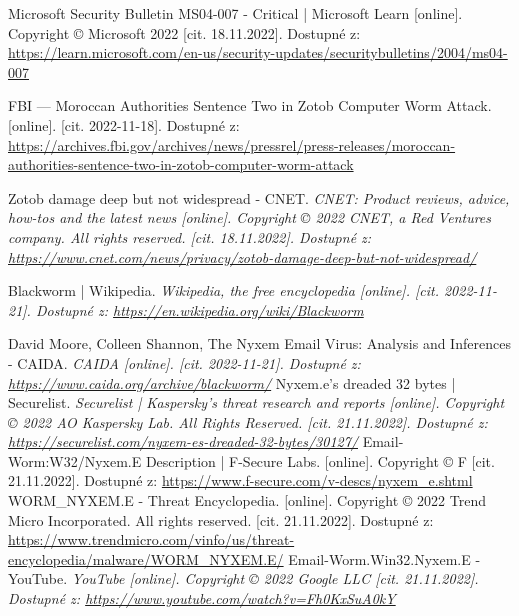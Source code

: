 \documentclass[a4paper,12pt]{article}
\begin{document}
{	
	{
		Microsoft Security Bulletin MS04-007 - Critical | Microsoft Learn
		[online]. Copyright © Microsoft 2022 [cit. 18.11.2022]. 
		Dostupné z: \url{https://learn.microsoft.com/en-us/security-updates/securitybulletins/2004/ms04-007}
	}
	
	{
		FBI — Moroccan Authorities Sentence Two in Zotob Computer Worm Attack. 
		[online]. [cit. 2022-11-18].
		Dostupné z: \url{https://archives.fbi.gov/archives/news/pressrel/press-releases/moroccan-authorities-sentence-two-in-zotob-computer-worm-attack}
	}
	
	{
		Zotob damage deep but not widespread - CNET. 
		\it{CNET: Product reviews, advice, how-tos and the latest news}
		[online]. Copyright © 2022 CNET, a Red Ventures company. All rights reserved. [cit. 18.11.2022].
		Dostupné z: \url{https://www.cnet.com/news/privacy/zotob-damage-deep-but-not-widespread/}
	}
	
	{
		Blackworm | Wikipedia.
		\it{Wikipedia, the free encyclopedia} [online]. [cit. 2022-11-21].
		Dostupné z: \url{https://en.wikipedia.org/wiki/Blackworm}
	}
	
	{
		David Moore, Colleen Shannon,
		The Nyxem Email Virus: Analysis and Inferences - CAIDA.
		\it{CAIDA} [online]. [cit. 2022-11-21].
		Dostupné z: \url{https://www.caida.org/archive/blackworm/}
	}
	{
		Nyxem.e’s dreaded 32 bytes | Securelist.
		\it{Securelist | Kaspersky’s threat research and reports} [online].
		Copyright © 2022 AO Kaspersky Lab. All Rights Reserved. [cit. 21.11.2022].
		Dostupné z: \url{https://securelist.com/nyxem-es-dreaded-32-bytes/30127/}
	}
	{
		Email-Worm:W32/Nyxem.E Description | F-Secure Labs.
		[online]. Copyright © F [cit. 21.11.2022].
		Dostupné z: \url{https://www.f-secure.com/v-descs/nyxem_e.shtml}
	}
	{
		WORM\_NYXEM.E - Threat Encyclopedia.
		[online]. Copyright © 2022 Trend Micro Incorporated. All rights reserved.
		[cit. 21.11.2022].
		Dostupné z: \url{https://www.trendmicro.com/vinfo/us/threat-encyclopedia/malware/WORM_NYXEM.E/}
	}
	{
		Email-Worm.Win32.Nyxem.E - YouTube.
		\it{YouTube} [online]. Copyright © 2022 Google LLC [cit. 21.11.2022].
		Dostupné z: \url{https://www.youtube.com/watch?v=Fh0KxSuA0kY}
	}
	
}
\end{document}
